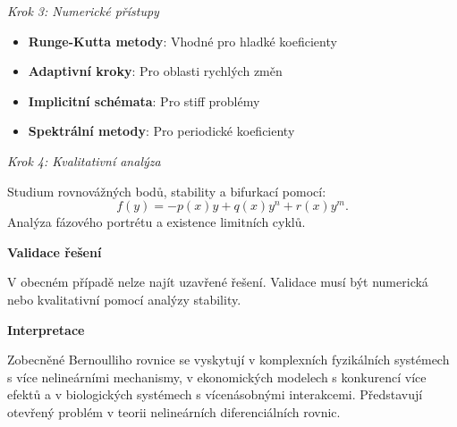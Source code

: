 \begin{example}
\noindent\textit{Krok 3: Numerické přístupy}

\begin{itemize}
\item \textbf{Runge-Kutta metody}: Vhodné pro hladké koeficienty
\item \textbf{Adaptivní kroky}: Pro oblasti rychlých změn
\item \textbf{Implicitní schémata}: Pro stiff problémy
\item \textbf{Spektrální metody}: Pro periodické koeficienty
\end{itemize}

\noindent\textit{Krok 4: Kvalitativní analýza}

Studium rovnovážných bodů, stability a bifurkací pomocí:
\[
f(y) = -p(x)y + q(x)y^n + r(x)y^m.
\]
Analýza fázového portrétu a existence limitních cyklů.

\vspace{1.5\baselineskip}

\noindent\textbf{Validace řešení}

V obecném případě nelze najít uzavřené řešení. Validace musí být numerická 
nebo kvalitativní pomocí analýzy stability.

\vspace{1.5\baselineskip}

\noindent\textbf{Interpretace}

Zobecněné Bernoulliho rovnice se vyskytují v komplexních fyzikálních systémech 
s více nelineárními mechanismy, v ekonomických modelech s konkurencí více efektů 
a v biologických systémech s vícenásobnými interakcemi. Představují otevřený 
problém v teorii nelineárních diferenciálních rovnic.

\end{example}

\vspace{2\baselineskip}

